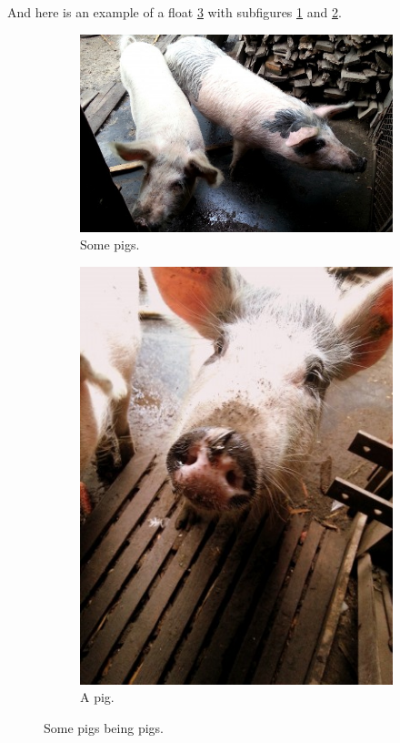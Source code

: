 
And here is an example of a float \ref{fig:subex} with subfigures
\ref{fig:subex:pigs} and \ref{fig:subex:pig}.

\begin{figure}[!h]
  \centering
  \begin{subfigure}[b]{0.3\textwidth}
    \includegraphics[width=\textwidth]{static/img/pigs1.jpg}
    \caption{Some pigs.}
    \label{fig:subex:pigs}
  \end{subfigure}
  \begin{subfigure}[b]{0.3\textwidth}
    \includegraphics[width=\textwidth]{static/img/pigs2.jpg}
    \caption{A pig.}
    \label{fig:subex:pig}
  \end{subfigure}
  \caption{Some pigs being pigs.}
  \label{fig:subex}
\end{figure}
